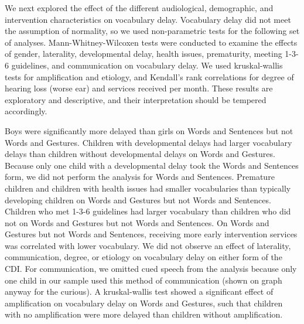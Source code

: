 \documentclass[english,man]{apa6}
\begin{document}
We next explored the effect of the different audiological, demographic, and intervention characteristics on vocabulary delay. Vocabulary delay did not meet the assumption of normality, so we used non-parametric tests for the following set of analyses. Mann-Whitney-Wilcoxen tests were conducted to examine the effects of gender, laterality, developmental delay, health issues, prematurity, meeting 1-3-6 guidelines, and communication on vocabulary delay. We used kruskal-wallis tests for amplification and etiology, and Kendall's rank correlations for degree of hearing loss (worse ear) and services received per month. These results are exploratory and descriptive, and their interpretation should be tempered accordingly.

Boys were significantly more delayed than girls on Words and Sentences but not Words and Gestures. Children with developmental delays had larger vocabulary delays than children without developmental delays on Words and Gestures. Because only one child with a developmental delay took the Words and Sentences form, we did not perform the analysis for Words and Sentences. Premature children and children with health issues had smaller vocabularies than typically developing children on Words and Gestures but not Words and Sentences. Children who met 1-3-6 guidelines had larger vocabulary than children who did not on Words and Gestures but not Words and Sentences. On Words and Gestures but not Words and Sentences, receiving more early intervention services was correlated with lower vocabulary. We did not observe an effect of laterality, communication, degree, or etiology on vocabulary delay on either form of the CDI. For communication, we omitted cued speech from the analysis because only one child in our sample used this method of communication (shown on graph anyway for the curious). A kruskal-wallis test showed a significant effect of amplification on vocabulary delay on Words and Gestures, such that children with no amplification were more delayed than children without amplification.
\end{document}
